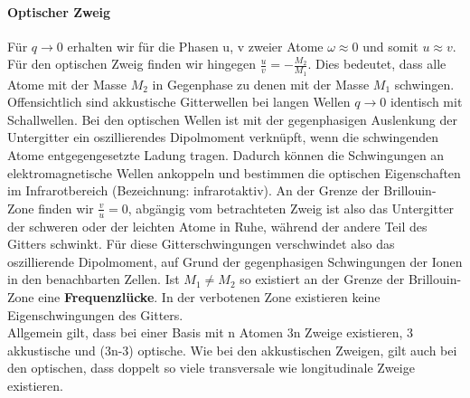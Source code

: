 \documentclass[11pt]{article}
\begin{document}
\paragraph{Optischer Zweig} \noindent Für $q\to 0$ erhalten wir für die Phasen
u, v zweier Atome $\omega \approx 0$ und somit $u \approx v$. Für den optischen
Zweig finden wir hingegen $\frac{u}{v}=-\frac{M_2}{M_1}$. Dies bedeutet, dass
alle Atome mit der Masse $M_2$ in Gegenphase zu denen mit der Masse $M_1$
schwingen. Offensichtlich sind akkustische Gitterwellen bei langen Wellen $
q\to 0$ identisch mit Schallwellen. Bei den optischen Wellen ist mit der
gegenphasigen Auslenkung der Untergitter ein oszillierendes Dipolmoment
verknüpft, wenn die schwingenden Atome entgegengesetzte Ladung tragen. Dadurch
können die Schwingungen an elektromagnetische Wellen ankoppeln und bestimmen
die optischen Eigenschaften im Infrarotbereich (Bezeichnung: infrarotaktiv).
An der Grenze der Brillouin-Zone finden wir $\frac{v}{u}=0$, abgängig vom
betrachteten Zweig ist also das Untergitter der schweren oder der leichten
Atome in Ruhe, während der andere Teil des Gitters schwinkt. Für diese
Gitterschwingungen verschwindet also das oszillierende Dipolmoment, auf Grund
der gegenphasigen Schwingungen der Ionen in den benachbarten Zellen. Ist $M_1
\neq M_2$ so existiert an der Grenze der Brillouin-Zone eine \textbf{
Frequenzlücke}. In der verbotenen Zone existieren keine Eigenschwingungen des
Gitters. \\
Allgemein gilt, dass bei einer Basis mit n Atomen 3n Zweige
existieren, 3 akkustische und (3n-3) optische. Wie bei den akkustischen Zweigen,
gilt auch bei den optischen, dass doppelt so viele transversale wie
longitudinale Zweige existieren.
\end{document}
